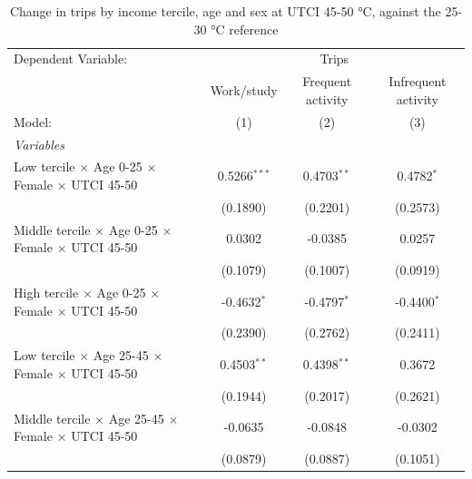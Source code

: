 
\begin{table}[htbp]
   \caption{\label{table_intersectionality_45-50} Change in trips by income tercile, age and sex at UTCI 45-50 °C, against the 25-30 °C reference}
   \centering
   \scriptsize
   \renewcommand*{\arraystretch}{0.75}
   \begin{tabular}{lccc}
      \tabularnewline \midrule \midrule
      Dependent Variable: & \multicolumn{3}{c}{Trips}\\
                                                                                & Work/study      & Frequent activity & Infrequent activity \\   
      Model:                                                                    & (1)             & (2)               & (3)\\  
      \midrule
      \emph{Variables}\\
      Low tercile $\times$ Age 0-25 $\times$ Female $\times$ UTCI 45-50         & 0.5266$^{***}$  & 0.4703$^{**}$     & 0.4782$^{*}$\\   
                                                                                & (0.1890)        & (0.2201)          & (0.2573)\\   
      Middle tercile $\times$ Age 0-25 $\times$ Female $\times$ UTCI 45-50      & 0.0302          & -0.0385           & 0.0257\\   
                                                                                & (0.1079)        & (0.1007)          & (0.0919)\\   
      High tercile $\times$ Age 0-25 $\times$ Female $\times$ UTCI 45-50        & -0.4632$^{*}$   & -0.4797$^{*}$     & -0.4400$^{*}$\\   
                                                                                & (0.2390)        & (0.2762)          & (0.2411)\\   
      Low tercile $\times$ Age 25-45 $\times$ Female $\times$ UTCI 45-50        & 0.4503$^{**}$   & 0.4398$^{**}$     & 0.3672\\   
                                                                                & (0.1944)        & (0.2017)          & (0.2621)\\   
      Middle tercile $\times$ Age 25-45 $\times$ Female $\times$ UTCI 45-50     & -0.0635         & -0.0848           & -0.0302\\   
                                                                                & (0.0879)        & (0.0887)          & (0.1051)\\   

\end{tabular}
\end{table}
